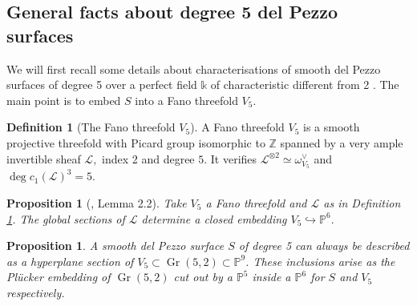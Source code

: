 \documentclass{amsart}
\theoremstyle{plain}%
\newtheorem{prop}[subsubsection]{Proposition}
\theoremstyle{remark}
\theoremstyle{definition}
\newtheorem{deff}[subsubsection]{Definition}
\newcommand{\cL}{\mathcal{L}}
\newcommand{\ek}{\mathbb{k}}
\newcommand{\eP}{\mathbb{P}}
\newcommand{\eZ}{\mathbb{Z}}
\newcommand{\Grass}{\operatorname{Gr}}
\begin{document}
\subsection{General facts about degree 5 del Pezzo surfaces}

We will first recall some details about characterisations of smooth del Pezzo surfaces of degree 5 over a perfect field $\ek$ of characteristic different from 2 . The main point is to embed $S$ into a Fano threefold $V_5.$

\begin{deff}[The Fano threefold $V_5$]\label{DEF - variete Fano quintique}
A Fano threefold $V_5$ is a smooth projective threefold with Picard group isomorphic to $\eZ$ spanned by a very ample invertible sheaf $\cL,$ index 2 and degree $5.$ It verifies $\cL^{\otimes 2} \simeq \omega_{V_5}^\vee$ and $\deg c_1(\cL)^3 = 5.$
\end{deff}

\begin{prop}[\cite{FN89}, Lemma 2.2]\label{PROP - plongement V5 dans P6}
Take $V_5$ a Fano threefold and $\cL$ as in Definition \ref{DEF - variete Fano quintique}. The global sections of $\cL$ determine a closed embedding $V_5 \hookrightarrow \eP^6.$
\end{prop}

\begin{prop}\label{PROP - plongement dP dans V5 dans P9}
A smooth del Pezzo surface $S$ of degree 5 can always be described as a hyperplane section of $V_5\subset \Grass(5,2) \subset \eP^9$. These inclusions arise as the Plücker embedding of $\Grass(5,2)$ cut out by a $\eP^5$ inside a $\eP^6$ for $S$ and $V_5$ respectively.
\end{prop}
\end{document}
